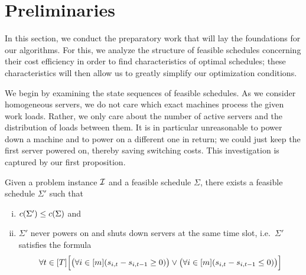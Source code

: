 
\chapter{Preliminaries}
In this section, we conduct the preparatory work that will lay the foundations for our algorithms. For this, we analyze the structure of feasible schedules concerning their cost efficiency in order to find characteristics of optimal schedules; these characteristics will then allow us to greatly simplify our optimization conditions.

We begin by examining the state sequences of feasible schedules. As we consider homogeneous servers, we do not care which exact machines process the given work loads. Rather, we only care about the number of active servers and the distribution of loads between them. It is in particular unreasonable to power down a machine and to power on a different one in return; we could just keep the first server powered on, thereby saving switching costs.
This investigation is captured by our first proposition.
\begin{prop}\label{prop:reasonable_switching}
Given a problem instance $\mathcal{I}$ and a feasible schedule $\Sigma$, there exists a feasible schedule $\Sigma'$ such that 
\begin{enumerate}[(i)]
		\item $c(\Sigma')\le c(\Sigma)$ and 
		\item $\Sigma'$ never powers on and shuts down servers at the same time slot, i.e.\ $\Sigma'$ satisfies the formula
\begin{equation}
	\forall t\in[T]\Bigl[\bigl(\forall i\in[m](s_{i,t}-s_{i,t-1}\ge0)\bigr)\lor\bigl(\forall i\in[m](s_{i,t}-s_{i,t-1}\le 0)\bigr)\Bigr]\label{eq:reasonable_switching}
\end{equation}
\end{enumerate}
\end{prop}
